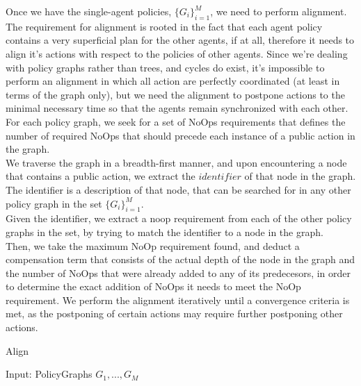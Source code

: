\documentclass[letterpaper]{article} %
\begin{document}
Once we have the single-agent policies, $\{G_i\}_{i=1}^M$, we need to perform alignment. The requirement for alignment is rooted in the fact that each agent policy contains a very superficial plan for the other agents, if at all, therefore it needs to align it's actions with respect to the policies of other agents. Since we're dealing with policy graphs rather than trees, and cycles do exist, it's impossible to perform an alignment in which all action are perfectly coordinated (at least in terms of the graph only), but we need the alignment to postpone actions to the minimal necessary time so that the agents remain synchronized with each other.
For each policy graph, we seek for a set of NoOps requirements that defines the number of required NoOps that should precede each instance of a public action in the graph. \\
We traverse the graph in a breadth-first manner, and upon encountering a node that contains a public action, we extract the $identifier$ of that node in the graph. The identifier is a description of that node, that can be searched for in any other policy graph in the set $\{G_i\}_{i=1}^M$.\\
Given the identifier, we extract a noop requirement from each of the other policy graphs in the set, by trying to match the identifier to a node in the graph.\\
Then, we take the maximum NoOp requirement found, and deduct a compensation term that consists of the actual depth of the node in the graph and the number of NoOps that were already added to any of its predecesors, in order to determine the exact addition of NoOps it needs to meet the NoOp requirement.\newline
We perform the alignment iteratively until a convergence criteria is met, as the postponing of certain actions may require further postponing other actions.

\begin{algorithm}
\caption{Align}
\begin{algorithmic}[tbph]
\State Input: PolicyGraphs $G_1,..., G_M$
	\EndFor
	\EndIf
	\EndWhile
\EndFor
{}
\end{algorithmic}
\end{algorithm}
\end{document}

